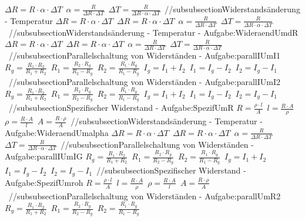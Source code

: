 $ \Delta R = R\cdot \alpha \cdot \Delta T $\ 
$ \alpha  = \frac{R}{\Delta R\cdot \Delta T} $\ 
$ \Delta T = \frac{   R}{\Delta R\cdot \alpha \cdot \Delta T} $\ 
//subsubsection{Widerstandsänderung - Temperatur} 
$ \Delta R = R\cdot \alpha \cdot \Delta T $\ 
$ \Delta R = R\cdot \alpha \cdot \Delta T $\ 
$ \alpha  = \frac{R}{\Delta R\cdot \Delta T} $\ 
$ \Delta T = \frac{   R}{\Delta R\cdot \alpha \cdot \Delta T} $\ 
//subsubsection{Widerstandsänderung - Temperatur - Aufgabe:WideraendUmdR} 
$ \Delta R = R\cdot \alpha \cdot \Delta T $\ 
$ \Delta R = R\cdot \alpha \cdot \Delta T $\ 
$ \alpha  = \frac{R}{\Delta R\cdot \Delta T} $\ 
$ \Delta T = \frac{   R}{\Delta R\cdot \alpha \cdot \Delta T} $\ 
//subsubsection{Parallelschaltung von Widerständen - Aufgabe:parallIUmI1} 
$ R_{g}  = \frac{R_{1} \cdot R_{2} }{R_{1} +R_{2} } $\ 
$ R_{1}  = \frac{R_{2} \cdot R_{g} }{R_{2} -R_{g} } $\ 
$ R_{2}  = \frac{R_{1} \cdot R_{g} }{R_{1} -R_{g} } $\ 
$ I_{g}  = I_{1}  + I_{2} $\ 
$ I_{1}  = I_{g}  - I_{2} $\ 
$ I_{2}  = I_{g}  - I_{1} $\ 
//subsubsection{Parallelschaltung von Widerständen - Aufgabe:parallIUmI2} 
$ R_{g}  = \frac{R_{1} \cdot R_{2} }{R_{1} +R_{2} } $\ 
$ R_{1}  = \frac{R_{2} \cdot R_{g} }{R_{2} -R_{g} } $\ 
$ R_{2}  = \frac{R_{1} \cdot R_{g} }{R_{1} -R_{g} } $\ 
$ I_{g}  = I_{1}  + I_{2} $\ 
$ I_{1}  = I_{g}  - I_{2} $\ 
$ I_{2}  = I_{g}  - I_{1} $\ 
//subsubsection{Spezifischer Widerstand - Aufgabe:SpezifUmR} 
$ R = \frac{\rho \cdot l}{ A} $\ 
$ l = \frac{R\cdot A}{ \rho } $\ 
$ \rho  = \frac{R\cdot A}{ l} $\ 
$ A = \frac{R\cdot \rho }{ A} $\ 
//subsubsection{Widerstandsänderung - Temperatur - Aufgabe:WideraendUmalpha} 
$ \Delta R = R\cdot \alpha \cdot \Delta T $\ 
$ \Delta R = R\cdot \alpha \cdot \Delta T $\ 
$ \alpha  = \frac{R}{\Delta R\cdot \Delta T} $\ 
$ \Delta T = \frac{   R}{\Delta R\cdot \alpha \cdot \Delta T} $\ 
//subsubsection{Parallelschaltung von Widerständen - Aufgabe:parallIUmIG} 
$ R_{g}  = \frac{R_{1} \cdot R_{2} }{R_{1} +R_{2} } $\ 
$ R_{1}  = \frac{R_{2} \cdot R_{g} }{R_{2} -R_{g} } $\ 
$ R_{2}  = \frac{R_{1} \cdot R_{g} }{R_{1} -R_{g} } $\ 
$ I_{g}  = I_{1}  + I_{2} $\ 
$ I_{1}  = I_{g}  - I_{2} $\ 
$ I_{2}  = I_{g}  - I_{1} $\ 
//subsubsection{Spezifischer Widerstand - Aufgabe:SpezifUmroh} 
$ R = \frac{\rho \cdot l}{ A} $\ 
$ l = \frac{R\cdot A}{ \rho } $\ 
$ \rho  = \frac{R\cdot A}{ l} $\ 
$ A = \frac{R\cdot \rho }{ A} $\ 
//subsubsection{Parallelschaltung von Widerständen - Aufgabe:parallUmR2} 
$ R_{g}  = \frac{R_{1} \cdot R_{2} }{R_{1} +R_{2} } $\ 
$ R_{1}  = \frac{R_{2} \cdot R_{g} }{R_{2} -R_{g} } $\ 
$ R_{2}  = \frac{R_{1} \cdot R_{g} }{R_{1} -R_{g} } $\ 
